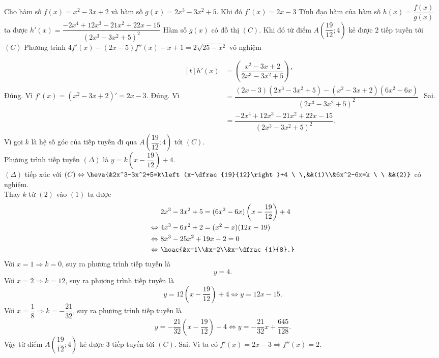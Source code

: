 \begin{ex}%
Cho hàm số $f(x)=x^2-3x+2$ và hàm số $g(x)=2x^3-3x^2+5$. Khi đó
\choiceTF
{\True $f'(x)=2x-3$}
{\True Tính đạo hàm của hàm số $h(x)=\dfrac{f(x)}{g(x)}$ ta được $h'(x)=\dfrac{-2x^4+12x^3-21x^2+22x-15}{(2x^3-3x^2+5)^2}$}
{Hàm số $g(x)$ có đồ thị $(C)$. Khi đó từ điểm $A\left(\dfrac{19}{12};4\right)$ kẻ được $2$ tiếp tuyến tới $(C)$}
{Phương trình $4f'(x)-(2x-5)f'' (x)-x+1=2\sqrt{25-x^2}$ vô nghiệm}
\loigiai
{
\begin{itemchoice}
\itemch Đúng. Vì $f'(x)=(x^2-3x+2)'=2x-3$.
\itemch Đúng. Vì
$\begin{aligned}[t]
h'(x)&=\left(\dfrac{x^2-3x+2}{2x^3-3x^2+5}\right)'\\
&=\dfrac{(2x-3)(2x^3-3x^2+5)-(x^2-3x+2)(6x^2-6x)}{(2x^3-3x^2+5)^2}\\
&=\dfrac{-2x^4+12x^3-21x^2+22x-15}{(2x^3-3x^2+5)^2}.
\end{aligned}$
\itemch Sai. Vì gọi $k$ là hệ số góc của tiếp tuyến đi qua $A\left(\dfrac{19}{12};4\right)$ tới $(C)$.\\
Phương trình tiếp tuyến $(\Delta)$ là $y=k\left(x-\dfrac{19}{12}\right)+4$. \\
$(\Delta)$ tiếp xúc với $(C) \Leftrightarrow \heva{&2x^3-3x^2+5=k\left(x-\dfrac{19}{12}\right)+4 \ \ &&(1)\\&6x^2-6x=k \ \ &&(2)}$ có nghiệm.\\
Thay $k$ từ $(2)$ vào $(1)$ ta được \\
\[\begin{aligned}
& \ 2x^3-3x^2+5=(6x^2-6x)\left(x-\dfrac{19}{12}\right)+4 \\
\Leftrightarrow & \ 4x^3-6x^2+2=(x^2-x)(12x-19) \\
\Leftrightarrow & \ 8x^3-25x^2+19x-2=0 \\
\Leftrightarrow & \ \hoac{&x=1\\&x=2\\&x=\dfrac{1}{8}.}
\end{aligned}\]
Với $x=1 \Rightarrow k=0$, suy ra phương trình tiếp tuyến là
\[y=4.\]
Với $x=2\Rightarrow k=12$, suy ra phương trình tiếp tuyến là
\[y=12\left(x-\dfrac{19}{12}\right)+4 \Leftrightarrow y=12x-15.\]
Với $x=\dfrac{1}{8}\Rightarrow k=-\dfrac{21}{32}$, suy ra phương trình tiếp tuyến là
\[y=-\dfrac{21}{32}\left(x-\dfrac{19}{12}\right)+4 \Leftrightarrow y=-\dfrac{21}{32}x+\dfrac{645}{128}.\]
Vậy từ điểm $A\left(\dfrac{19}{12};4\right)$ kẻ được $3$ tiếp tuyến tới $(C)$.
\itemch Sai. Vì ta có $f'(x)=2x-3 \Rightarrow f'' (x)=2$.\\

\end{itemchoice}}
\end{ex}
